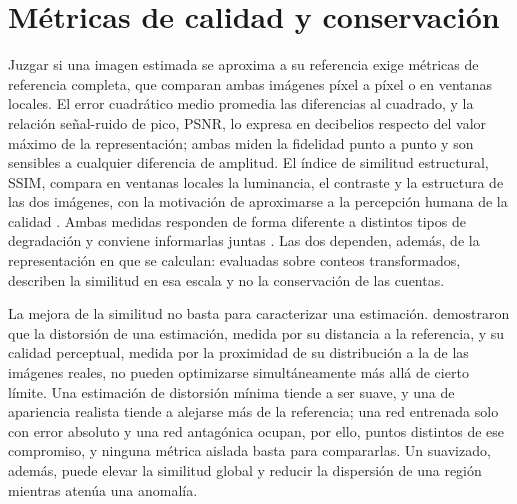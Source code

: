 \section{Métricas de calidad y conservación}
\label{sec:mt-metricas}

Juzgar si una imagen estimada se aproxima a su referencia exige métricas de referencia completa, que comparan ambas imágenes píxel a píxel o en ventanas locales. El error cuadrático medio promedia las diferencias al cuadrado, y la relación señal-ruido de pico, PSNR, lo expresa en decibelios respecto del valor máximo de la representación; ambas miden la fidelidad punto a punto y son sensibles a cualquier diferencia de amplitud. El índice de similitud estructural, SSIM, compara en ventanas locales la luminancia, el contraste y la estructura de las dos imágenes, con la motivación de aproximarse a la percepción humana de la calidad \parencite{wang2004}. Ambas medidas responden de forma diferente a distintos tipos de degradación y conviene informarlas juntas \parencite{hore2010}. Las dos dependen, además, de la representación en que se calculan: evaluadas sobre conteos transformados, describen la similitud en esa escala y no la conservación de las cuentas.

La mejora de la similitud no basta para caracterizar una estimación. \textcite{blau2018} demostraron que la distorsión de una estimación, medida por su distancia a la referencia, y su calidad perceptual, medida por la proximidad de su distribución a la de las imágenes reales, no pueden optimizarse simultáneamente más allá de cierto límite. Una estimación de distorsión mínima tiende a ser suave, y una de apariencia realista tiende a alejarse más de la referencia; una red entrenada solo con error absoluto y una red antagónica ocupan, por ello, puntos distintos de ese compromiso, y ninguna métrica aislada basta para compararlas. Un suavizado, además, puede elevar la similitud global y reducir la dispersión de una región mientras atenúa una anomalía.

